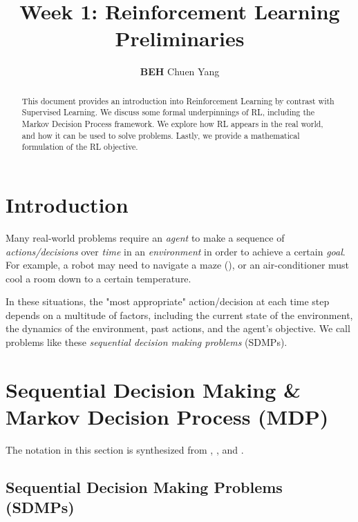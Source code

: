 \documentclass{article} %
\title{Week 1: Reinforcement Learning Preliminaries}
\author{\textbf{BEH} Chuen Yang}
\begin{document}
\ifcolmsubmission
\linenumbers
\fi

\maketitle

\begin{abstract}
This document provides an introduction into Reinforcement Learning by contrast with Supervised Learning. 
We discuss some formal underpinnings of RL, including the Markov Decision Process framework.
We explore how RL appears in the real world, and how it can be used to solve problems.
Lastly, we provide a mathematical formulation of the RL objective.
\end{abstract}

\section{Introduction}
Many real-world problems require an \textit{agent} to make a sequence of 
\textit{actions/decisions} over \textit{time} in an \textit{environment} 
in order to achieve a certain \textit{goal}.
For example, a robot may need to navigate a maze (\cite{Muller-2023}), 
or an air-conditioner must cool a room down to a certain temperature.

In these situations, the "most appropriate" action/decision at each time step depends
on a multitude of factors, including the current state of the environment,
the dynamics of the environment, past actions, and the agent's objective.
We call problems like these \textit{sequential decision making problems} (SDMPs).

\section{Sequential Decision Making \& Markov Decision Process (MDP)} \label{sdmp_notation}
The notation in this section is synthesized from \cite{SpinningUp-2018}, \cite{Levine-et-al-2023}, and \cite{Sutton-and-Barto-1998}.

\subsection{Sequential Decision Making Problems (SDMPs)}
\end{document}
